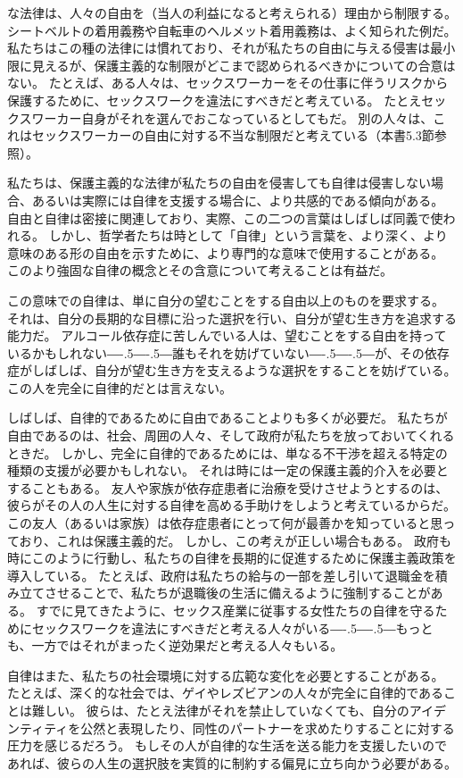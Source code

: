 \documentclass[paper=a4,book,openany]{jlreq}
\def\DDASH{―\kern-.5\zw―\kern-.5\zw―} %
\begin{document}
な法律は、人々の自由を（当人の利益になると考えられる）理由から制限する。
シートベルトの着用義務や自転車のヘルメット着用義務は、よく知られた例だ。
私たちはこの種の法律には慣れており、それが私たちの自由に与える侵害は最小限に見えるが、保護主義的な制限がどこまで認められるべきかについての合意はない。
たとえば、ある人々は、セックスワーカーをその仕事に伴うリスクから保護するために、セックスワークを違法にすべきだと考えている。
たとえセックスワーカー自身がそれを選んでおこなっているとしてもだ。
別の人々は、これはセックスワーカーの自由に対する不当な制限だと考えている（本書5.3節参照）。

私たちは、保護主義的な法律が私たちの自由を侵害しても自律は侵害しない場合、あるいは実際には自律を支援する場合に、より共感的である傾向がある。
自由と自律は密接に関連しており、実際、この二つの言葉はしばしば同義で使われる。
しかし、哲学者たちは時として「自律」という言葉を、より深く、より意味のある形の自由を示すために、より専門的な意味で使用することがある。
このより強固な自律の概念とその含意について考えることは有益だ。

この意味での自律は、単に自分の望むことをする自由以上のものを要求する。
それは、自分の長期的な目標に沿った選択を行い、自分が望む生き方を追求する能力だ。
アルコール依存症に苦しんでいる人は、望むことをする自由を持っているかもしれない{\DDASH}誰もそれを妨げていない{\DDASH}が、その依存症がしばしば、自分が望む生き方を支えるような選択をすることを妨げている。
この人を完全に自律的だとは言えない。

しばしば、自律的であるために自由であることよりも多くが必要だ。
私たちが自由であるのは、社会、周囲の人々、そして政府が私たちを放っておいてくれるときだ。
しかし、完全に自律的であるためには、単なる不干渉を超える特定の種類の支援が必要かもしれない。
それは時には一定の保護主義的介入を必要とすることもある。
友人や家族が依存症患者に治療を受けさせようとするのは、彼らがその人の人生に対する自律を高める手助けをしようと考えているからだ。
この友人（あるいは家族）は依存症患者にとって何が最善かを知っていると思っており、これは保護主義的だ。
しかし、この考えが正しい場合もある。
政府も時にこのように行動し、私たちの自律を長期的に促進するために保護主義政策を導入している。
たとえば、政府は私たちの給与の一部を差し引いて退職金を積み立てさせることで、私たちが退職後の生活に備えるように強制することがある。
すでに見てきたように、セックス産業に従事する女性たちの自律を守るためにセックスワークを違法にすべきだと考える人々がいる{\DDASH}もっとも、一方ではそれがまったく逆効果だと考える人々もいる。

自律はまた、私たちの社会環境に対する広範な変化を必要とすることがある。
たとえば、深く的な社会では、ゲイやレズビアンの人々が完全に自律的であることは難しい。
彼らは、たとえ法律がそれを禁止していなくても、自分のアイデンティティを公然と表現したり、同性のパートナーを求めたりすることに対する圧力を感じるだろう。
もしその人が自律的な生活を送る能力を支援したいのであれば、彼らの人生の選択肢を実質的に制約する偏見に立ち向かう必要がある。
\end{document}
